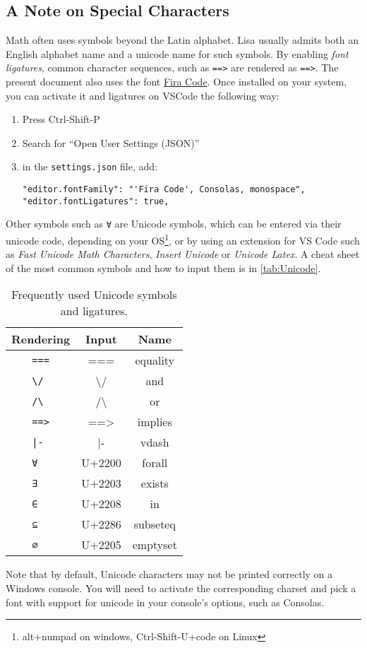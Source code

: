 \subsection*{A Note on Special Characters}
Math often uses symbols beyond the Latin alphabet. Lisa usually admits both an English alphabet name and a unicode name for such symbols. By enabling \emph{font ligatures}, common character sequences, such as \lstinline|=|\lstinline|=|\lstinline|>| are rendered as \lstinline|==>|. 
The present document also uses the font \href{https://github.com/tonsky/FiraCode}{Fira Code}. Once installed on your system, you can activate it and ligatures on VSCode the following way:
\begin{enumerate}
  \item Press Ctrl-Shift-P
  \item Search for ``Open User Settings (JSON)''
  \item in the \lstinline|settings.json| file, add:
  \begin{lstlisting}
"editor.fontFamily": "'Fira Code', Consolas, monospace",
"editor.fontLigatures": true,
  \end{lstlisting}
\end{enumerate}
Other symbols such as \lstinline|∀| are Unicode symbols, which can be entered via their unicode code, depending on your OS\footnote{alt+numpad on windows, Ctrl-Shift-U+code on Linux}, or by using an extension for VS Code such as \emph{Fast Unicode Math Characters}, \emph{Insert Unicode} or \emph{Unicode Latex}.
A cheat sheet of the most common symbols and how to input them is in \autoref{tab:Unicode}.
\begin{table}
  \center
  \begin{tabular}{c|c|c}
    Rendering         & Input            & Name     \\ \hline
    \lstinline| === | & ===              & equality \\ \hline
    \lstinline| \/  | & \textbackslash / & and      \\ \hline
    \lstinline| /\  | & /\textbackslash  & or       \\ \hline
    \lstinline| ==> | & ==>              & implies  \\ \hline
    \lstinline+ |-  + &  |-              & vdash    \\ \hline
    \lstinline| ∀   | & U+2200           & forall   \\ \hline
    \lstinline| ∃   | & U+2203           & exists   \\ \hline
    \lstinline| ∈   | & U+2208           & in       \\ \hline
    \lstinline| ⊆   | & U+2286           & subseteq \\ \hline
    \lstinline| ∅   | & U+2205           & emptyset \\ 
  \end{tabular}
  \caption{Frequently used Unicode symbols and ligatures.}
  \label{tab:Unicode}
\end{table}
Note that by default, Unicode characters may not be printed correctly on a Windows console. You will need to activate the corresponding charset and pick a font with support for unicode in your console's options, such as Consolas.

